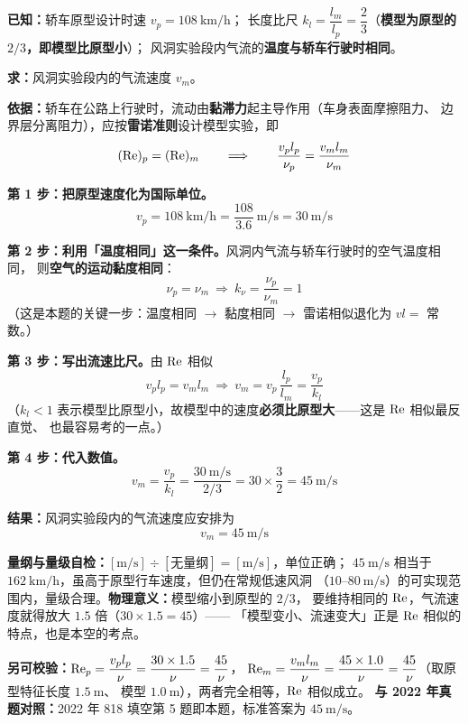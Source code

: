 \begin{jie}
\textbf{已知：}轿车原型设计时速 $v_p=108\ \mathrm{km/h}$；
长度比尺 $k_l=\dfrac{l_m}{l_p}=\dfrac{2}{3}$（\textbf{模型为原型的 $2/3$，即模型比原型小}）；
风洞实验段内气流的\textbf{温度与轿车行驶时相同}。

\textbf{求：}风洞实验段内的气流速度 $v_m$。

\textbf{依据：}轿车在公路上行驶时，流动由\textbf{黏滞力}起主导作用（车身表面摩擦阻力、
边界层分离阻力），应按\textbf{雷诺准则}设计模型实验，即
\[ (\mathrm{Re})_p=(\mathrm{Re})_m\qquad\Longrightarrow\qquad \frac{v_p l_p}{\nu_p}=\frac{v_m l_m}{\nu_m} \]

\textbf{第 1 步：把原型速度化为国际单位。}
\[ v_p=108\ \mathrm{km/h}=\frac{108}{3.6}\ \mathrm{m/s}=30\ \mathrm{m/s} \]

\textbf{第 2 步：利用「温度相同」这一条件。}风洞内气流与轿车行驶时的空气温度相同，
则\textbf{空气的运动黏度相同}：
\[ \nu_p=\nu_m\ \Longrightarrow\ k_\nu=\frac{\nu_p}{\nu_m}=1 \]
（这是本题的关键一步：温度相同 $\to$ 黏度相同 $\to$ 雷诺相似退化为 $v l=$ 常数。）

\textbf{第 3 步：写出流速比尺。}由 $\mathrm{Re}$ 相似
\[ v_p l_p=v_m l_m\ \Longrightarrow\ v_m=v_p\,\frac{l_p}{l_m}=\frac{v_p}{k_l} \]
（$k_l<1$ 表示模型比原型小，故模型中的速度\textbf{必须比原型大}——这是 $\mathrm{Re}$ 相似最反直觉、
也最容易考的一点。）

\textbf{第 4 步：代入数值。}
\[ v_m=\frac{v_p}{k_l}=\frac{30\ \mathrm{m/s}}{2/3}
   =30\times\frac{3}{2}=45\ \mathrm{m/s} \]

\textbf{结果：}风洞实验段内的气流速度应安排为
\[ \boxed{v_m=45\ \mathrm{m/s}} \]

\textbf{量纲与量级自检：}$[\mathrm{m/s}]\div[\text{无量纲}]=[\mathrm{m/s}]$，单位正确；
$45\ \mathrm{m/s}$ 相当于 $162\ \mathrm{km/h}$，虽高于原型行车速度，但仍在常规低速风洞
（$10$--$80\ \mathrm{m/s}$）的可实现范围内，量级合理。\textbf{物理意义：}模型缩小到原型的 $2/3$，
要维持相同的 $\mathrm{Re}$，气流速度就得放大 $1.5$ 倍（$30\times1.5=45$）——
「模型变小、流速变大」正是 $\mathrm{Re}$ 相似的特点，也是本空的考点。

\textbf{另可校验：}$\mathrm{Re}_p=\dfrac{v_p l_p}{\nu}=\dfrac{30\times1.5}{\nu}=\dfrac{45}{\nu}$，
$\mathrm{Re}_m=\dfrac{v_m l_m}{\nu}=\dfrac{45\times1.0}{\nu}=\dfrac{45}{\nu}$（取原型特征长度 $1.5\ \mathrm{m}$、
模型 $1.0\ \mathrm{m}$），两者完全相等，$\mathrm{Re}$ 相似成立。
\textbf{与 2022 年真题对照：}2022 年 818 填空第 5 题即本题，标准答案为 $45\ \mathrm{m/s}$。
\end{jie}


